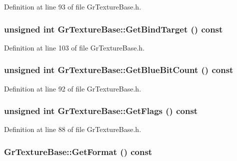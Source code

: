 \begin{CompactItemize}
Definition at line 93 of file GrTextureBase.h.\hypertarget{class_gr_texture_base_a165e1c3061d2b3e2446a6d6566487ed}{
\subsubsection[{GetBindTarget}]{\setlength{\rightskip}{0pt plus 5cm}unsigned int GrTextureBase::GetBindTarget () const}}
\label{class_gr_texture_base_a165e1c3061d2b3e2446a6d6566487ed}




Definition at line 103 of file GrTextureBase.h.\hypertarget{class_gr_texture_base_8f049be60f5a5d093575d72914451351}{
\subsubsection[{GetBlueBitCount}]{\setlength{\rightskip}{0pt plus 5cm}unsigned int GrTextureBase::GetBlueBitCount () const}}
\label{class_gr_texture_base_8f049be60f5a5d093575d72914451351}




Definition at line 92 of file GrTextureBase.h.\hypertarget{class_gr_texture_base_6ef12d9062a6178f2bf497334761f357}{
\subsubsection[{GetFlags}]{\setlength{\rightskip}{0pt plus 5cm}unsigned int GrTextureBase::GetFlags () const}}
\label{class_gr_texture_base_6ef12d9062a6178f2bf497334761f357}




Definition at line 88 of file GrTextureBase.h.\hypertarget{class_gr_texture_base_9238a4bd7db2676e072b3eb85b14c684}{
\subsubsection[{GetFormat}]{ GrTextureBase::GetFormat () const}}
\label{class_gr_texture_base_9238a4bd7db2676e072b3eb85b14c684}





\end{CompactItemize}
